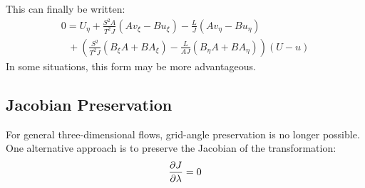 This can finally be written:
\begin{equation}
\label{eq:grid-angle-preserving-U}
\begin{array}{l}
0 = {U_\eta } + \frac{{{S^2}A}}{{{T^2}J}}\left( {A{v_\xi } - B{u_\xi }} \right) - \frac{L}{J}\left( {A{v_\eta } - B{u_\eta }} \right)\\
\,\,\,\, + \left( {\frac{{{S^2}}}{{{T^2}J}}\left( {{B_\xi }A + B{A_\xi }} \right) - \frac{L}{{AJ}}\left( {{B_\eta }A + B{A_\eta }} \right)} \right)\left( {U - u} \right)
\end{array}
\end{equation}
In some situations, this form may be more advantageous.

\subsection{Jacobian Preservation}
\label{sec:UCS-Jacobian}

For general three-dimensional flows, grid-angle preservation is no longer possible. One alternative approach is to preserve the Jacobian of the transformation: 
\begin{equation}
\label{eq:jacobian-preserving-init}
\frac{\partial J}{\partial \lambda}=0
\end{equation}


